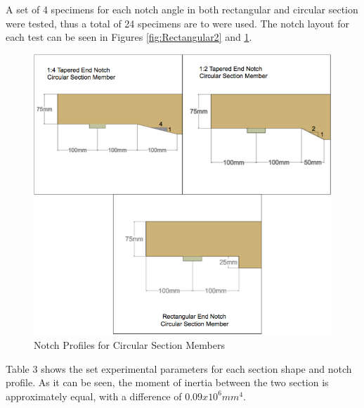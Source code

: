 \documentclass[11pt,a4paper]{article}
\numberwithin{equation}{subsection}
\begin{document}
\noindent
A set of 4 specimens for each notch angle in both rectangular and circular section were tested, thus a total of 24 specimens are to were used. The notch layout for each test can be seen in Figures \ref{fig:Rectangular2} and \ref{fig:Circular}.
\vspace*{\baselineskip}
\begin{figure}[h]
	\begin{center}
		\includegraphics[scale=0.55]{Circular_Notch_Angles}
	\end{center}
	\caption{Notch Profiles for Circular Section Members}
	\label{fig:Circular}
\end{figure}

\noindent
Table 3 shows the set experimental parameters for each section shape and notch profile. As it can be seen, the moment of inertia between the two section is approximately equal, with a difference of $0.09 x 10^{6} mm^{4}$.

\pagebreak
{}
\end{document}
